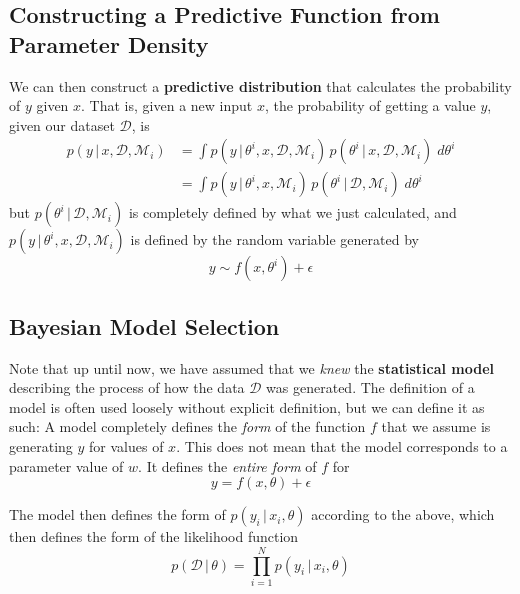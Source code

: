 \documentclass{article}
\begin{document}
  \subsection{Constructing a Predictive Function from Parameter Density}

    We can then construct a \textbf{predictive distribution} that calculates the probability of $y$ given $x$. That is, given a new input $x$, the probability of getting a value $y$, given our dataset $\mathcal{D}$, is
    \begin{align*}
      p(y\,|\,x, \mathcal{D}, \mathcal{M}_i) & = \int p(y\,|\,\theta^i, x, \mathcal{D}, \mathcal{M}_i) \, p(\theta^i \,|\, x, \mathcal{D}, \mathcal{M}_i)\; d\theta^i \\
      & = \int p(y\,|\,\theta^i, x, \mathcal{M}_i)\, p(\theta^i \,|\,\mathcal{D}, \mathcal{M}_i)\; d\theta^i
    \end{align*}
    but $p(\theta^i\,|\,\mathcal{D}, \mathcal{M}_i)$ is completely defined by what we just calculated, and $p(y\,|\,\theta^i, x, \mathcal{D}, \mathcal{M}_i)$ is defined by the random variable generated by
    \begin{equation}
      y \sim f(x, \theta^i) + \epsilon
    \end{equation}

  \subsection{Bayesian Model Selection}

    Note that up until now, we have assumed that we \textit{knew} the \textbf{statistical model} describing the process of how the data $\mathcal{D}$ was generated. The definition of a model is often used loosely without explicit definition, but we can define it as such: A model completely defines the \textit{form} of the function $f$ that we assume is generating $y$ for values of $x$. This does not mean that the model corresponds to a parameter value of $w$. It defines the \textit{entire form} of $f$ for
    \begin{equation}
      y = f(x, \theta) + \epsilon
    \end{equation}

    The model then defines the form of $p(y_i\,|\,x_i, \theta)$ according to the above, which then defines the form of the likelihood function
    \begin{equation}
      p(\mathcal{D}\,|\,\theta) = \prod_{i=1}^N p(y_i\,|\,x_i, \theta)
    \end{equation}
\end{document}
